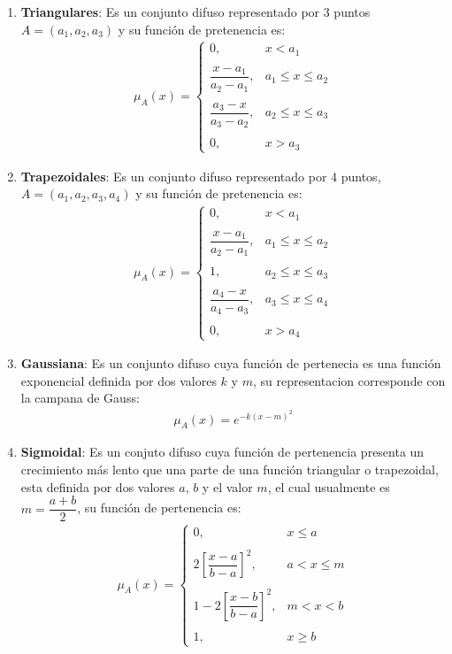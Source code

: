 \documentclass[a4paper,10pt,twocolumn]{article}
\begin{document}
\begin{enumerate}
	\item \textbf{Triangulares}: Es un conjunto difuso representado por 3 puntos $A = (a_1, a_2, a_3)$ y su funci\'on de pretenencia es:
		\begin{align*}
			\mu_A (x) = \begin{cases}
				0, & x < a_1 \\\\
				\dfrac{x - a_1}{a_2 - a_1}, & a_1 \leq x \leq a_2 \\\\
				\dfrac{a_3 - x}{a_3 - a_2}, & a_2 \leq x \leq a_3 \\\\
				0, & x > a_3
			\end{cases}
		\end{align*}
		
	\item \textbf{Trapezoidales}: Es un conjunto difuso representado por 4 puntos, $A = (a_1, a_2, a_3, a_4) $ y su funci\'on de pretenencia es:
		\begin{align*}
		\mu_A (x) = \begin{cases}
			0, & x < a_1 \\\\
			\dfrac{x - a_1}{a_2 - a_1}, & a_1 \leq x \leq a_2 \\\\
			1, & a_2 \leq x \leq a_3 \\\\
			\dfrac{a_4 - x}{a_4 - a_3}, & a_3 \leq x \leq a_4 \\\\
			0, & x > a_4
		\end{cases}
		\end{align*}
	
	\item \textbf{Gaussiana}: Es un conjunto difuso cuya funci\'on de pertenecia es una funci\'on exponencial definida por dos valores $k$ y $m$, su representacion corresponde con la campana de Gauss:
		\begin{align*}
			\mu_A (x) = e^{-k(x-m)^{2}}
		\end{align*}
	
	\item \textbf{Sigmoidal}: Es un conjuto difuso cuya funci\'on de pertenencia presenta un crecimiento m\'as lento que una parte de una funci\'on triangular o trapezoidal, esta definida por dos valores $a$, $b$ y el valor $m$, el cual usualmente es $m = \dfrac{a + b}{2}$, su funci\'on de pertenencia es:
		\begin{align*}
			\mu_A (x) = \begin{cases}
				0, & x \leq a \\\\
				2\left[ \dfrac{x - a}{b - a}
				\right]^{2}, & a < x \leq m	 \\\\
				1 - 2 \left[
				\dfrac{x - b}{b - a}
				\right]^{2}, & m < x < b \\\\
				1, & x \geq b
			\end{cases}
		\end{align*}
\end{enumerate}
\end{document}
